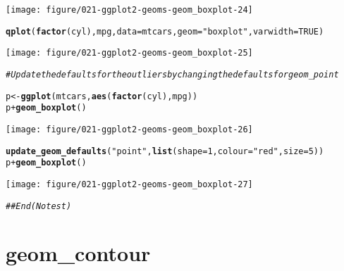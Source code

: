 \documentclass[a4paper,titlepage]{tufte-handout}\usepackage[]{graphicx}\usepackage[]{color}
\makeatletter
\def\maxwidth{ %
  \ifdim\Gin@nat@width>\linewidth
    \linewidth
  \else
    \Gin@nat@width
  \fi
}
\newcommand{\hlnum}[1]{\textcolor[rgb]{0.686,0.059,0.569}{#1}}%
\newcommand{\hlstr}[1]{\textcolor[rgb]{0.192,0.494,0.8}{#1}}%
\newcommand{\hlcom}[1]{\textcolor[rgb]{0.678,0.584,0.686}{\textit{#1}}}%
\newcommand{\hlopt}[1]{\textcolor[rgb]{0,0,0}{#1}}%
\newcommand{\hlstd}[1]{\textcolor[rgb]{0.345,0.345,0.345}{#1}}%
\newcommand{\hlkwb}[1]{\textcolor[rgb]{0.69,0.353,0.396}{#1}}%
\newcommand{\hlkwc}[1]{\textcolor[rgb]{0.333,0.667,0.333}{#1}}%
\newcommand{\hlkwd}[1]{\textcolor[rgb]{0.737,0.353,0.396}{\textbf{#1}}}%
\newenvironment{kframe}{%
 \def\at@end@of@kframe{}%
 \ifinner\ifhmode%
  \def\at@end@of@kframe{\end{minipage}}%
  \begin{minipage}{\columnwidth}%
 \fi\fi%
 \def\FrameCommand##1{\hskip\@totalleftmargin \hskip-\fboxsep
 \colorbox{shadecolor}{##1}\hskip-\fboxsep
     \hskip-\linewidth \hskip-\@totalleftmargin \hskip\columnwidth}%
 \MakeFramed {\advance\hsize-\width
   \@totalleftmargin\z@ \linewidth\hsize
   \@setminipage}}%
 {\par\unskip\endMakeFramed%
 \at@end@of@kframe}
\newenvironment{knitrout}{}{} %
\makeatother
\begin{document}
\begin{knitrout}
\begin{kframe}
{\ttfamily\noindent\color{warningcolor}{\#\# Warning in loop\_apply(n, do.ply): position\_dodge requires constant width: output may be incorrect}}\end{kframe}
\texttt{[image: figure/021-ggplot2-geoms-geom\_boxplot-24]} 
\begin{kframe}\begin{alltt}
\hlkwd{qplot}\hlstd{(}\hlkwd{factor}\hlstd{(cyl), mpg,} \hlkwc{data} \hlstd{= mtcars,} \hlkwc{geom} \hlstd{=} \hlstr{"boxplot"}\hlstd{,} \hlkwc{varwidth} \hlstd{=} \hlnum{TRUE}\hlstd{)}
\end{alltt}


{\ttfamily\noindent\color{warningcolor}{\#\# Warning in loop\_apply(n, do.ply): position\_dodge requires constant width: output may be incorrect}}\end{kframe}
\texttt{[image: figure/021-ggplot2-geoms-geom\_boxplot-25]} 
\begin{kframe}\begin{alltt}
\hlcom{# Update the defaults for the outliers by changing the defaults for geom_point}

\hlstd{p} \hlkwb{<-} \hlkwd{ggplot}\hlstd{(mtcars,} \hlkwd{aes}\hlstd{(}\hlkwd{factor}\hlstd{(cyl), mpg))}
\hlstd{p} \hlopt{+} \hlkwd{geom_boxplot}\hlstd{()}
\end{alltt}
\end{kframe}
\texttt{[image: figure/021-ggplot2-geoms-geom\_boxplot-26]} 
\begin{kframe}\begin{alltt}
\hlkwd{update_geom_defaults}\hlstd{(}\hlstr{"point"}\hlstd{,} \hlkwd{list}\hlstd{(}\hlkwc{shape} \hlstd{=} \hlnum{1}\hlstd{,} \hlkwc{colour} \hlstd{=} \hlstr{"red"}\hlstd{,} \hlkwc{size} \hlstd{=} \hlnum{5}\hlstd{))}
\hlstd{p} \hlopt{+} \hlkwd{geom_boxplot}\hlstd{()}
\end{alltt}
\end{kframe}
\texttt{[image: figure/021-ggplot2-geoms-geom\_boxplot-27]} 
\begin{kframe}\begin{alltt}
\hlcom{## End(No test)}
\end{alltt}
\end{kframe}
\end{knitrout}


\section{geom\_contour}
\end{document}
